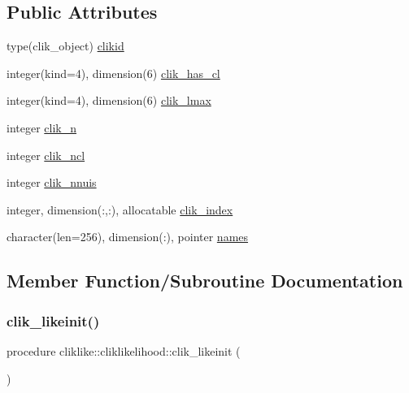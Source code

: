 \subsection*{Public Attributes}
\begin{DoxyCompactItemize}
\item 
type(clik\+\_\+object) \mbox{\hyperlink{structcliklike_1_1cliklikelihood_a471d0dbd7224a64099ee8d1eb3c346c7}{clikid}}
\item 
integer(kind=4), dimension(6) \mbox{\hyperlink{structcliklike_1_1cliklikelihood_a585e10cd51c97e6079abf384dd86f6ba}{clik\+\_\+has\+\_\+cl}}
\item 
integer(kind=4), dimension(6) \mbox{\hyperlink{structcliklike_1_1cliklikelihood_a181c233ea3ab7518c9fdebc029c34c58}{clik\+\_\+lmax}}
\item 
integer \mbox{\hyperlink{structcliklike_1_1cliklikelihood_a083c4c7b399467032698d6dff201c8de}{clik\+\_\+n}}
\item 
integer \mbox{\hyperlink{structcliklike_1_1cliklikelihood_a7a16e546132390bc4415695f954089c5}{clik\+\_\+ncl}}
\item 
integer \mbox{\hyperlink{structcliklike_1_1cliklikelihood_abe7530b5fadee5219bbe175cc9a92ee0}{clik\+\_\+nnuis}}
\item 
integer, dimension(\+:,\+:), allocatable \mbox{\hyperlink{structcliklike_1_1cliklikelihood_a8b7e8d18c56236481b73892a294e1f9c}{clik\+\_\+index}}
\item 
character(len=256), dimension(\+:), pointer \mbox{\hyperlink{structcliklike_1_1cliklikelihood_a6d116d362b3bae465a349c3c10eae112}{names}}
\end{DoxyCompactItemize}


\subsection{Member Function/\+Subroutine Documentation}
\mbox{\label{structcliklike_1_1cliklikelihood_a58a26c7fd7b72af9480a08dfb7c2d172}} 
\subsubsection{\texorpdfstring{clik\+\_\+likeinit()}{clik\_likeinit()}}
{\footnotesize\ttfamily procedure cliklike\+::cliklikelihood\+::clik\+\_\+likeinit (\begin{DoxyParamCaption}{ }\end{DoxyParamCaption})}


